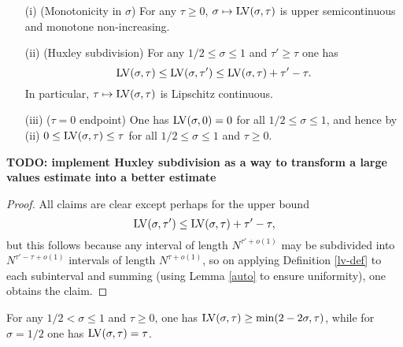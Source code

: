 \begin{lemma}\label{lv-basic}
    \begin{itemize}
        \item[(i)] (Monotonicity in $\sigma$) For any $\tau \geq 0$, $\sigma \mapsto \mathrm{LV}(\sigma,\tau)$ is upper semicontinuous and monotone non-increasing.
        \item[(ii)] (Huxley subdivision) For any $1/2 \leq \sigma \leq 1$ and $\tau' \geq \tau$ one has
$$ \mathrm{LV}(\sigma,\tau) \leq \mathrm{LV}(\sigma,\tau') \leq \mathrm{LV}(\sigma,\tau) + \tau'-\tau.$$
In particular, $\tau \mapsto \mathrm{LV}(\sigma,\tau)$ is Lipschitz continuous.
        \item[(iii)]  ($\tau=0$ endpoint) One has $\mathrm{LV}(\sigma,0)=0$ for all $1/2 \leq \sigma \leq 1$, and hence by (ii) $0 \leq \mathrm{LV}(\sigma,\tau) \leq \tau$ for all $1/2 \leq \sigma \leq 1$ and $\tau \geq 0$.
    \end{itemize}
\end{lemma}

{\bf TODO: implement Huxley subdivision as a way to transform a large values estimate into a better estimate}

\begin{proof}
All claims are clear except perhaps for the upper bound
$$ \mathrm{LV}(\sigma,\tau') \leq \mathrm{LV}(\sigma,\tau) + \tau'-\tau,$$
but this follows because any interval of length $N^{\tau'+o(1)}$ may be subdivided into $N^{\tau'-\tau+o(1)}$ intervals of length $N^{\tau+o(1)}$, so on applying Definition \ref{lv-def} to each subinterval and summing (using Lemma \ref{auto} to ensure uniformity), one obtains the claim.
\end{proof}

\begin{lemma}\label{lv-lower}  For any $1/2 < \sigma \leq 1$ and $\tau \geq 0$, one has $\mathrm{LV}(\sigma, \tau) \geq \min(2 - 2 \sigma,\tau)$, while for $\sigma=1/2$ one has $\mathrm{LV}(\sigma,\tau) = \tau$.
\end{lemma}


